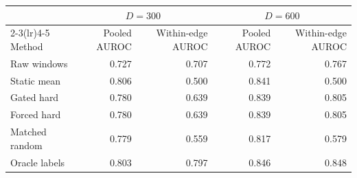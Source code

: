 \begin{tabular}{lrrrr}
\toprule
 & \multicolumn{2}{c}{$D=300$} & \multicolumn{2}{c}{$D=600$} \\
\cmidrule(lr){2-3}\cmidrule(lr){4-5}
Method & Pooled AUROC & Within-edge AUROC & Pooled AUROC & Within-edge AUROC \\
\midrule
Raw windows & 0.727 & 0.707 & 0.772 & 0.767 \\
Static mean & 0.806 & 0.500 & 0.841 & 0.500 \\
Gated hard & 0.780 & 0.639 & 0.839 & 0.805 \\
Forced hard & 0.780 & 0.639 & 0.839 & 0.805 \\
Matched random & 0.779 & 0.559 & 0.817 & 0.579 \\
Oracle labels & 0.803 & 0.797 & 0.846 & 0.848 \\
\bottomrule
\end{tabular}
